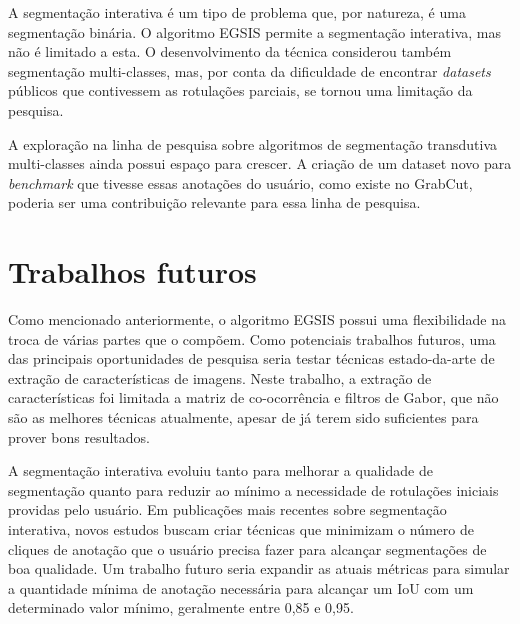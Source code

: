 A segmentação interativa é um tipo de problema que, por natureza, é
uma segmentação binária. O algoritmo \gls{EGSIS} permite a segmentação
interativa, mas não é limitado a esta. O desenvolvimento da técnica
considerou também segmentação multi-classes, mas, por conta da
dificuldade de encontrar \textit{datasets} públicos que contivessem as
rotulações parciais, se tornou uma limitação da pesquisa.

A exploração na linha de pesquisa sobre algoritmos de segmentação
transdutiva multi-classes ainda possui espaço para crescer. A criação
de um dataset novo para \textit{benchmark} que tivesse essas anotações do
usuário, como existe no GrabCut, poderia ser uma contribuição
relevante para essa linha de pesquisa.


\section{Trabalhos futuros}\label{sec:trabalhos-futuros}

Como mencionado anteriormente, o algoritmo \gls{EGSIS} possui uma
flexibilidade na troca de várias partes que o compõem. Como potenciais
trabalhos futuros, uma das principais oportunidades de pesquisa seria
testar técnicas estado-da-arte de extração de características de
imagens. Neste trabalho, a extração de características foi limitada a
matriz de co-ocorrência e filtros de Gabor, que não são as melhores
técnicas atualmente, apesar de já terem sido suficientes para prover
bons resultados.

A segmentação interativa evoluiu tanto para melhorar a qualidade de
segmentação quanto para reduzir ao mínimo a necessidade de
rotulações iniciais providas pelo usuário. Em publicações mais
recentes sobre segmentação interativa, novos estudos buscam criar
técnicas que minimizam o número de cliques de anotação que o usuário
precisa fazer para alcançar segmentações de boa qualidade. Um trabalho
futuro seria expandir as atuais métricas para simular a quantidade
mínima de anotação necessária para alcançar um IoU com um determinado
valor mínimo, geralmente entre 0,85 e 0,95.
